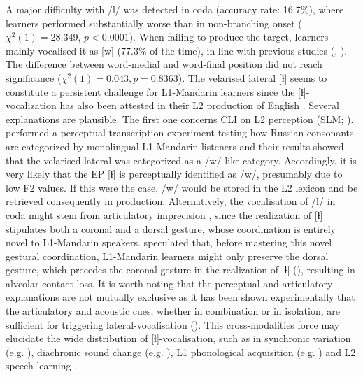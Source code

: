 \documentclass[output=paper]{../langscibook}
\begin{document}
A major difficulty with /l/ was detected in coda (accuracy rate: 16.7\%), where learners performed substantially worse than in non-branching onset ($\chi^2(1) = 28.349$, $p<0.0001$). When failing to produce the target, learners mainly vocalised it as [w] (77.3\% of the time), in line with previous studies (\citealt{Batalha1995}, \citealt{Martins2008}). The difference between word-medial and word-final position did not reach significance ($\chi^2(1) = 0.043, p=0.8363$). The velarised lateral [ɫ] seems to constitute a persistent challenge for L1-Mandarin learners since the [ɫ]-vocalization has also been attested in their L2 production of English \citep{He2014}. Several explanations are plausible. The first one concerns CLI on L2 perception (SLM; \citealt{Flege1995}). \citet{GuanKwon2016} performed a perceptual transcription experiment testing how Russian consonants are categorized by monolingual L1-Mandarin listeners and their results showed that the velarised lateral was categorized as a /w/-like category. Accordingly, it is very likely that the EP [ɫ] is perceptually identified as /w/, presumably due to low F2 values. If this were the case, /w/ would be stored in the L2 lexicon and be retrieved consequently in production. Alternatively, the vocalisation of /l/ in coda might stem from articulatory imprecision \citep{Honikman1964}, since the realization of [ɫ] stipulates both a coronal and a dorsal gesture, whose coordination is entirely novel to L1-Mandarin speakers. \citet{He2014} speculated that, before mastering this novel gestural coordination, L1-Mandarin learners might only preserve the dorsal gesture, which precedes the coronal gesture in the realization of [ɫ] (\citealt{SproatFujimura1993}), resulting in alveolar contact loss. It is worth noting that the perceptual and articulatory explanations are not mutually exclusive as it has been shown experimentally that the articulatory and acoustic cues, whether in combination or in isolation, are sufficient for triggering lateral-vocalisation (\citealt{RecasensEspinosa2010}). This cross-modalities force may elucidate the wide distribution of [ɫ]-vocalisation, such as in synchronic variation (e.g. \citealt{RecasensEspinosa2005,RecasensEspinosa2010}), diachronic sound change (e.g. \citealt{Graham2017}), L1 phonological acquisition (e.g. \citealt{Freitas1997}) and L2 speech learning \citep{He2014}.
\end{document}
